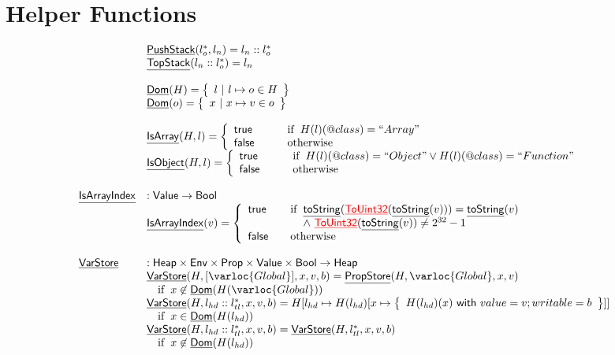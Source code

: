 \section{Helper Functions}
\[
\begin{array}{ll}
& \chf{PushStack}(l_o^*,l_n) = l_n::l_o^* \\
& \chf{TopStack}(l_n::l_o^*) = l_n \\\\
& \chf{Dom}(H) = \set{l\ |\ l\mapsto o \in H} \\
& \chf{Dom}(o) = \set{x\ |\ x\mapsto v \in o} \\
\\
& \chf{IsArray}(H,l) = \left\{
  \begin{array}{l@{\quad\quad\quad}l}
    \vtrue &\ifc{H(l)(\varprop{class}) =
  ``Array"}\\
    \vfalse &\owc\\
  \end{array}\right.
\\
& \chf{IsObject}(H,l) = \left\{
  \begin{array}{l@{\quad\quad\quad}l}
    \vtrue &\ifc{H(l)(\varprop{class}) =
  ``Object"\lor H(l)(\varprop{class}) = ``Function"}\\
    \vfalse &\owc\\
  \end{array}\right.
\\\\
\chf{IsArrayIndex} & : \SF{Value} \rightarrow \SF{Bool} \\
& \chf{IsArrayIndex}(v)
  = 
  \left\{
    \begin{array}{l@{\quad\quad}l}
      \vtrue & \ifc{\chf{toString}(\chf{\inred ToUint32}(\chf{toString}(v))) = \chf{toString}(v)\\
        \land\ \chf{\inred ToUint32}(\chf{toString}(v)) \neq 2^{32}-1} \\
      \vfalse & \owc\\
    \end{array}
  \right.
\\
\\

\chf{VarStore} & : \SF{Heap} \times \SF{Env} \times \SF{Prop} \times \SF{Value}
\times \SF{Bool} \rightarrow \SF{Heap} \\
& \chf{VarStore}(H,[\varloc{Global}], x, v, b)
  =  \chf{PropStore}(H,\varloc{Global},x,v) \\
& \quad\ifc{x\not\in\chf{Dom}(H(\varloc{Global}))} \\
& \chf{VarStore}(H,l_{hd}::l_{tl}^{*},x,v,b)
  =  H[l_{hd}\mapsto H(l_{hd})[x\mapsto \set{H(l_{hd})(x) \rwith value=v; writable=b}]]\\
& \quad\ifc{x \in \chf{Dom}(H(l_{hd}))}\\
& \chf{VarStore}(H,l_{hd}::l_{tl}^{*},x,v,b)
  =  \chf{VarStore}(H,l_{tl}^{*},x,v,b)\\
& \quad\ifc{x \not\in \chf{Dom}(H(l_{hd}))}\\\\


\end{array}\]
